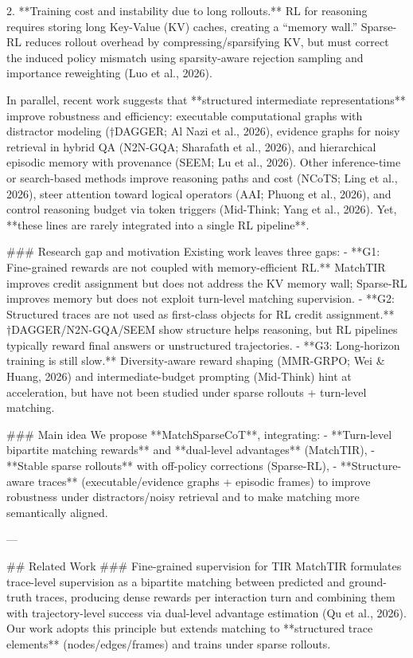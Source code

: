 2. **Training cost and instability due to long rollouts.** RL for reasoning requires storing long Key-Value (KV) caches, creating a “memory wall.” Sparse-RL reduces rollout overhead by compressing/sparsifying KV, but must correct the induced policy mismatch using sparsity-aware rejection sampling and importance reweighting (Luo et al., 2026).

In parallel, recent work suggests that **structured intermediate representations** improve robustness and efficiency: executable computational graphs with distractor modeling (†DAGGER; Al Nazi et al., 2026), evidence graphs for noisy retrieval in hybrid QA (N2N-GQA; Sharafath et al., 2026), and hierarchical episodic memory with provenance (SEEM; Lu et al., 2026). Other inference-time or search-based methods improve reasoning paths and cost (NCoTS; Ling et al., 2026), steer attention toward logical operators (AAI; Phuong et al., 2026), and control reasoning budget via token triggers (Mid-Think; Yang et al., 2026). Yet, **these lines are rarely integrated into a single RL pipeline**.

### Research gap and motivation
Existing work leaves three gaps:
- **G1: Fine-grained rewards are not coupled with memory-efficient RL.** MatchTIR improves credit assignment but does not address the KV memory wall; Sparse-RL improves memory but does not exploit turn-level matching supervision.
- **G2: Structured traces are not used as first-class objects for RL credit assignment.** †DAGGER/N2N-GQA/SEEM show structure helps reasoning, but RL pipelines typically reward final answers or unstructured trajectories.
- **G3: Long-horizon training is still slow.** Diversity-aware reward shaping (MMR-GRPO; Wei & Huang, 2026) and intermediate-budget prompting (Mid-Think) hint at acceleration, but have not been studied under sparse rollouts + turn-level matching.

### Main idea
We propose **MatchSparseCoT**, integrating:
- **Turn-level bipartite matching rewards** and **dual-level advantages** (MatchTIR),
- **Stable sparse rollouts** with off-policy corrections (Sparse-RL),
- **Structure-aware traces** (executable/evidence graphs + episodic frames) to improve robustness under distractors/noisy retrieval and to make matching more semantically aligned.

---

## Related Work
### Fine-grained supervision for TIR
MatchTIR formulates trace-level supervision as a bipartite matching between predicted and ground-truth traces, producing dense rewards per interaction turn and combining them with trajectory-level success via dual-level advantage estimation (Qu et al., 2026). Our work adopts this principle but extends matching to **structured trace elements** (nodes/edges/frames) and trains under sparse rollouts.

